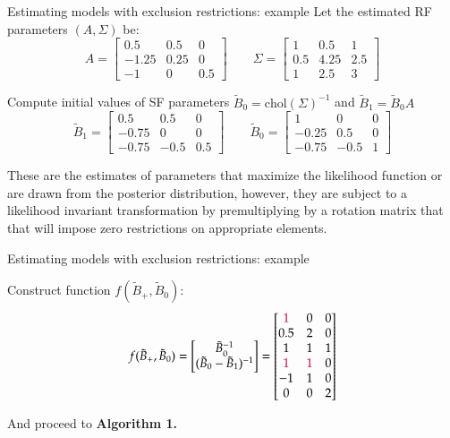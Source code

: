 \documentclass[notes,blackandwhite,mathsans,usenames,dvipsnames]{beamer}
\begin{document}
\begin{frame}{Estimating models with exclusion restrictions: example}
\small
{\color{mcxs2}Let the estimated RF parameters} $(A,\Sigma)$ {\color{mcxs2}be:}\footnotesize
$$A = \begin{bmatrix}0.5 & 0.5 &  0 \\-1.25& 0.25&  0\\-1& 0&  0.5\end{bmatrix}\qquad
\Sigma=\begin{bmatrix}1& 0.5&  1\\0.5& 4.25&  2.5\\1& 2.5&  3\end{bmatrix}$$

\small {\color{mcxs2}Compute initial values of SF parameters} $\tilde{B}_0=\text{chol}(\Sigma)^{-1}$ {\color{mcxs2}and} $\tilde{B}_1=\tilde{B}_0A$\footnotesize
$$\tilde{B}_1 = \begin{bmatrix}0.5&  0.5 & 0\\-0.75 & 0&  0\\-0.75& -0.5&  0.5\end{bmatrix}\qquad
\tilde{B}_0 = \begin{bmatrix}1& 0&  0\\-0.25&  0.5& 0\\-0.75& -0.5&1\end{bmatrix}$$

\smallskip\small {\color{mcxs2}These are the estimates of parameters that maximize the likelihood function or are drawn from the posterior distribution, however, they are subject to a likelihood invariant transformation by premultiplying by a rotation matrix that that will impose zero restrictions on appropriate elements.}

\end{frame}





\begin{frame}{Estimating models with exclusion restrictions: example}

{\color{mcxs2}Construct function} $f(\tilde{B}_+,\tilde{B}_0)$:
$$f(\tilde{B}_+,\tilde{B}_0) = \begin{bmatrix}\tilde{B}_0^{-1}\\ (\tilde{B}_0-\tilde{B}_1)^{-1}\end{bmatrix}=
\begin{bmatrix} {\color{purple}1}&0&0\\0.5&2&0\\1&1&1\\{\color{purple}1}&{\color{purple}1}&0\\-1&1&0\\0&0&2 \end{bmatrix}$$

{\color{mcxs2}And proceed to} \textbf{Algorithm 1.}

\end{frame}
\end{document}
